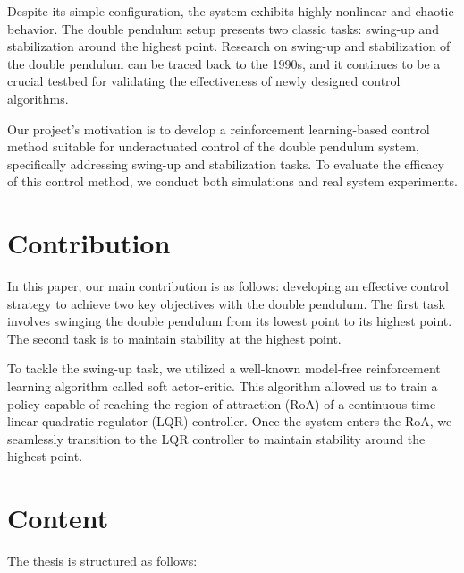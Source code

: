 Despite its simple configuration, the system exhibits highly nonlinear and chaotic behavior. The double pendulum setup presents two classic tasks: swing-up and stabilization around the highest point. Research on swing-up and stabilization of the double pendulum can be traced back to the 1990s, and it continues to be a crucial testbed for validating the effectiveness of newly designed control algorithms.

Our project's motivation is to develop a reinforcement learning-based control method suitable for underactuated control of the double pendulum system, specifically addressing swing-up and stabilization tasks. To evaluate the efficacy of this control method, we conduct both simulations and real system experiments.


\section{Contribution}
In this paper, our main contribution is as follows: developing an effective control strategy to achieve two key objectives with the double pendulum. The first task involves swinging the double pendulum from its lowest point to its highest point. The second task is to maintain stability at the highest point. 

To tackle the swing-up task, we utilized a well-known model-free reinforcement learning algorithm called soft actor-critic. This algorithm allowed us to train a policy capable of reaching the region of attraction (RoA) of a continuous-time linear quadratic regulator (LQR) controller. Once the system enters the RoA, we seamlessly transition to the LQR controller to maintain stability around the highest point.

\section{Content}
The thesis is structured as follows:


